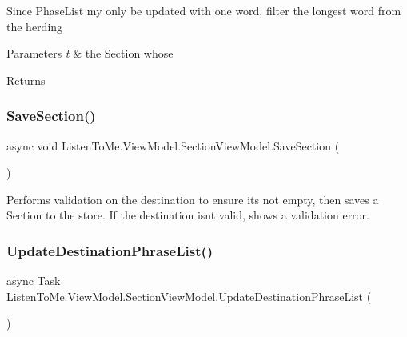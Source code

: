 Since Phase\+List my only be updated with one word, filter the longest word from the herding 


\begin{DoxyParams}{Parameters}
{\em t} & the Section whose \\
\hline
\end{DoxyParams}
\begin{DoxyReturn}{Returns}

\end{DoxyReturn}
\mbox{\label{class_listen_to_me_1_1_view_model_1_1_section_view_model_ad4c6cb932c883814993d3f1cc6b8b0f2}} 
\subsubsection{\texorpdfstring{Save\+Section()}{SaveSection()}}
{\footnotesize\ttfamily async void Listen\+To\+Me.\+View\+Model.\+Section\+View\+Model.\+Save\+Section (\begin{DoxyParamCaption}{ }\end{DoxyParamCaption})\hspace{0.3cm}{\ttfamily [private]}}



Performs validation on the destination to ensure it\textquotesingle{}s not empty, then saves a Section to the store. If the destination isn\textquotesingle{}t valid, shows a validation error. 

\mbox{\label{class_listen_to_me_1_1_view_model_1_1_section_view_model_a47ce8676fc601da4752a2ddab8d2250a}} 
\subsubsection{\texorpdfstring{Update\+Destination\+Phrase\+List()}{UpdateDestinationPhraseList()}}
{\footnotesize\ttfamily async Task Listen\+To\+Me.\+View\+Model.\+Section\+View\+Model.\+Update\+Destination\+Phrase\+List (\begin{DoxyParamCaption}{ }\end{DoxyParamCaption})}



